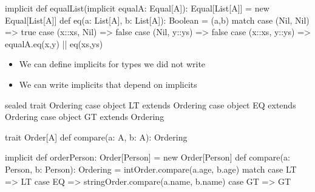 \documentclass[usenames,dvipsnames,svgnames,table,aspectratio=169,mathserif]{beamer}
\newcommand{\nl}{\vspace{\baselineskip}}
\newcommand{\pnl}{\pause \nl}
\begin{document}
\begin{frame}[fragile]
\begin{scalacode}
implicit def equalList(implicit equalA: Equal[A]): Equal[List[A]] =
  new Equal[List[A]] {
    def eq(a: List[A], b: List[A]): Boolean = {
      (a,b) match {
        case (Nil,   Nil)   => true
        case (x::xs, Nil)   => false
        case (Nil,   y::ys) => false
        case (x::xs, y::ys) => equalA.eq(x,y) || eq(xs,ys)
      }
    }
  }
\end{scalacode}
\end{frame}


\begin{frame}
\begin{itemize}
\item We can define implicits for types we did not write
\item We can write implicits that depend on implicits
\end{itemize}
\end{frame}


\begin{frame}[fragile]
\begin{scalacode}
sealed trait Ordering
case object LT extends Ordering
case object EQ extends Ordering
case object GT extends Ordering


trait Order[A] {
  def compare(a: A, b: A): Ordering
}
\end{scalacode}

\pnl

\begin{scalacode}
implicit def orderPerson: Order[Person] = new Order[Person] {
  def compare(a: Person, b: Person): Ordering =
    intOrder.compare(a.age, b.age) match {
      case LT => LT
      case EQ => stringOrder.compare(a.name, b.name)
      case GT => GT
    }
}
\end{scalacode}
\end{frame}
\end{document}
